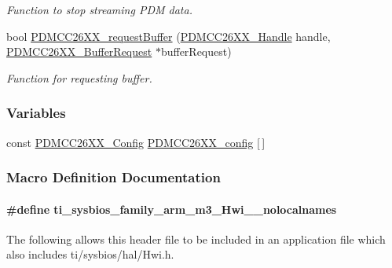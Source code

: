 \begin{DoxyCompactItemize}
\begin{DoxyCompactList}\small\item\em Function to stop streaming P\+D\+M data. \end{DoxyCompactList}\item 
bool \hyperlink{_p_d_m_c_c26_x_x_8h_a15a0017513c13ca244f7e3a0f5761e8d}{P\+D\+M\+C\+C26\+X\+X\+\_\+request\+Buffer} (\hyperlink{_p_d_m_c_c26_x_x_8h_ae5b9ecc0f8eb494e162b4a0a49c0636a}{P\+D\+M\+C\+C26\+X\+X\+\_\+\+Handle} handle, \hyperlink{struct_p_d_m_c_c26_x_x___buffer_request}{P\+D\+M\+C\+C26\+X\+X\+\_\+\+Buffer\+Request} $\ast$buffer\+Request)
\begin{DoxyCompactList}\small\item\em Function for requesting buffer. \end{DoxyCompactList}\end{DoxyCompactItemize}
\subsubsection*{Variables}
\begin{DoxyCompactItemize}
\item 
const \hyperlink{struct_p_d_m_c_c26_x_x___config}{P\+D\+M\+C\+C26\+X\+X\+\_\+\+Config} \hyperlink{_p_d_m_c_c26_x_x_8h_affba2052183dd56aa6315608a6ec2633}{P\+D\+M\+C\+C26\+X\+X\+\_\+config} \mbox{[}$\,$\mbox{]}
\end{DoxyCompactItemize}


\subsubsection{Macro Definition Documentation}
\paragraph[{ti\+\_\+sysbios\+\_\+family\+\_\+arm\+\_\+m3\+\_\+\+Hwi\+\_\+\+\_\+nolocalnames}]{\setlength{\rightskip}{0pt plus 5cm}\#define ti\+\_\+sysbios\+\_\+family\+\_\+arm\+\_\+m3\+\_\+\+Hwi\+\_\+\+\_\+nolocalnames}\label{_p_d_m_c_c26_x_x_8h_aaa17ecf48f5762e2e1bdb0bab8aacf0c}
The following allows this header file to be included in an application file which also includes ti/sysbios/hal/\+Hwi.\+h. 

